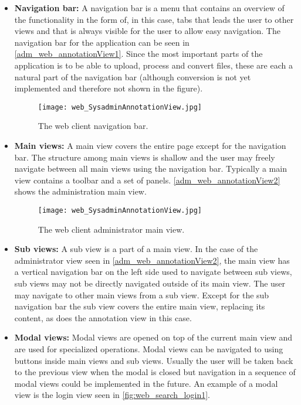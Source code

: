 \begin{itemize}
    \item \textbf{Navigation bar:}
A navigation bar is a menu that contains an overview of the functionality in the form of, in this case, tabs that leads the user to other views and that is always visible for the user to allow easy navigation. The navigation bar for the application can be seen in \autoref{adm_web_annotationView1}. Since the most important parts of the application is to be able to upload, process and convert files, these are each a natural part of the navigation bar (although conversion is not yet implemented and therefore not shown in the figure).

\begin{figure}
 \centering
 \texttt{[image: web\_SysadminAnnotationView.jpg]}
 \caption{The web client navigation bar.}
 \label{adm_web_annotationView1}
\end{figure}

	\item \textbf{Main views:}
A main view covers the entire page except for the navigation bar. The structure among main views is shallow and the user may freely navigate between all main views using the navigation bar. Typically a main view contains a toolbar and a set of panels. \autoref{adm_web_annotationView2} shows the administration main view.

\begin{figure}
 \centering
 \texttt{[image: web\_SysadminAnnotationView.jpg]}
 \caption{The web client administrator main view.}
 \label{adm_web_annotationView2}
\end{figure}

	\item \textbf{Sub views:}
A sub view is a part of a main view. In the case of the administrator view seen in \autoref{adm_web_annotationView2}, the main view has a vertical navigation bar on the left side used to navigate between sub views, sub views may not be directly navigated outside of its main view. The user may navigate to other main views from a sub view. Except for the sub navigation bar the sub view covers the entire main view, replacing its content, as does the annotation view in this case.

	\item \textbf{Modal views:}
Modal views are opened on top of the current main view and are used for specialized operations. Modal views can be navigated to using buttons inside main views and sub views. Usually the user will be taken back to the previous view when the modal is closed but navigation in a sequence of modal views could be implemented in the future. An example
of a modal view is the login view seen in \autoref{fig:web_search_login1}.


\end{itemize}
